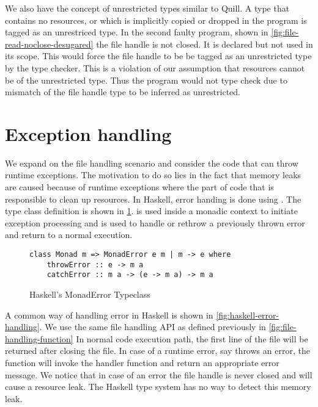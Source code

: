 We also have the concept of unrestricted types similar to Quill. A type that contains no resources, or which is implicitly
copied or dropped in the program is tagged as an unrestriced type. In the second faulty program,
shown in \cref{fig:file-read-noclose-desugared} the file handle  is not closed.
It is declared but not used in its scope. This would force the file handle to be be tagged as an unrestricted type by the \qub{} type checker.
This is a violation of our assumption that resources cannot be of the unrestricted type. Thus
the program would not type check due to mismatch of the file handle type to be inferred as unrestricted.


\section{Exception handling}
We expand on the file handling scenario and consider the code that can throw runtime exceptions.
The motivation to do so lies in the fact that memory leaks are caused because of runtime
exceptions where the part of code that is responsible to clean up resources. In Haskell, error handing is done using .
The type class definition is shown in \cref{fig:haskell-monaderror}.  is used inside a monadic context to initiate
exception processing and  is used to handle or rethrow a previously thrown error and return
to a normal execution.

\begin{figure}[h]
  \begin{framed}
\begin{verbatim}
class Monad m => MonadError e m | m -> e where
    throwError :: e -> m a
    catchError :: m a -> (e -> m a) -> m a
\end{verbatim}
  \end{framed}
  \caption{Haskell's MonadError Typeclass}
  \label{fig:haskell-monaderror}
\end{figure}

\noindent
A common way of handling error in Haskell is shown in \cref{fig:haskell-error-handling}.
We use the same file handling API as defined previously in \cref{fig:file-handling-function}
In normal code execution path, the first line of the file will be returned after closing the file.
In case of a runtime error, say  throws an error, the  function will
invoke the handler function and return an appropriate error message. We notice that in case of an error the file handle 
is never closed and will cause a resource leak. The Haskell type system has no way to detect this memory leak.

